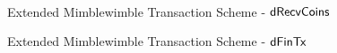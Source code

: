 \begin{landscape}
\begin{figure}
{{            \< \funStarAlt{\varSigContext} \opFunResult {} \< \\
            \< \varProofBobCarol \opFunResult \procDRProof{\funStarAlt{\varCoinShared}}{\varFundValue}{\varSecKeyAlice}{\varSecKeyBob} \< \\
            \< \varPreTx \opFunResult \procCreatePreTx{\varMsg}{\varInputs}{\varOutputs \opConc \funStarAlt{\varCoinShared}}{\varProofs \opConc \varProofBobCarol}{\funStarAlt{\varSigContext}}{\varCommits \opConc \varPubKeyBobCarol}{\varSigBobCarol} \< \\
            \pcreturn \varPreTx \< \< \pcreturn \varPreTx
            }
            }
        \caption{Extended Mimblewimble Transaction Scheme - $\mathsf{dRecvCoins}$ \label{fig:ext-mim-tx-recv}}
    \end{figure}
\end{landscape}

\begin{landscape}
    \begin{figure}
        \caption{Extended Mimblewimble Transaction Scheme - $\mathsf{dFinTx}$ \label{fig:ext-mim-tx-fin}}
    \end{figure}
\end{landscape}

